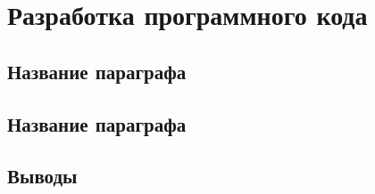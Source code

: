 \chapter{Разработка программного кода} \label{ch3}

\section{Название параграфа} \label{ch3:sec1}

\section{Название параграфа} \label{ch3:sec2}


\section{Выводы} \label{ch3:conclusion}

\newpage